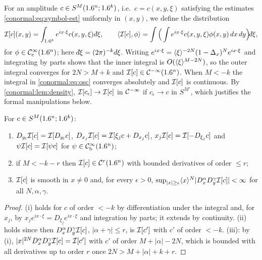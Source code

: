 For an amplitude $c\in S^M(1.6^n;1.6^k)$, i.e.\ $c=c(x,y,\xi)$ satisfying the
estimates \eqref{conormal:eq:symbol-est} uniformly in $(x,y)$, we define the
distribution
\begin{equation}\label{conormal:eq:osc}
  \osc{c}(x,y)=\int_{\R^k}e^{ix\cdot\xi}c(x,y,\xi)\,\dbar\xi,
  \qquad
  \pair{\osc{c}}{\phi}=\int\Big(\int e^{ix\cdot\xi}c(x,y,\xi)\phi(x,y)\,dx\,dy\Big)
  \dbar\xi,
\end{equation}
for $\phi\in\mathcal{C}^\infty_{\mathrm{c}}(1.6^n)$; here $\dbar\xi=(2\pi)^{-k}d\xi$.  Writing
$e^{ix\cdot\xi}=\langle \xi\rangle^{-2N}(1-\Delta_x)^Ne^{ix\cdot\xi}$ and integrating by
parts shows that the inner integral is $O(\langle \xi\rangle^{M-2N})$, so the outer
integral converges for $2N>M+k$ and $\mathcal{I}[c]\in\mathcal{C}^{-\infty}(1.6^n)$.  When $M<-k$ the
integral in \eqref{conormal:eq:osc} converges absolutely and $\mathcal{I}[c]$ is
continuous.  By \cref{conormal:lem:density}, $\mathcal{I}[c_\epsilon]\to\mathcal{I}[c]$ in
$\mathcal{C}^{-\infty}$ if $c_\epsilon\to c$ in $S^{M'}$, which justifies the formal
manipulations below.

\begin{lemma}\label{conormal:lem:osc-ops}
  For $c\in S^M(1.6^n;1.6^k)$:
  \begin{enumerate}[label=(\roman*)]
  \item $D_{y_l}\mathcal{I}[c]=\mathcal{I}[D_{y_l}c]$, $D_{x_j}\mathcal{I}[c]=\mathcal{I}[\xi_jc+D_{x_j}c]$,
    $x_j\mathcal{I}[c]=\mathcal{I}[-D_{\xi_j}c]$ and $\psi\mathcal{I}[c]=\mathcal{I}[\psi c]$ for
    $\psi\in\mathcal{C}^\infty_{\mathrm{b}}(1.6^n)$;
  \item if $M<-k-r$ then $\mathcal{I}[c]\in\mathcal C^r(1.6^n)$ with bounded derivatives
    of order $\le r$;
  \item $\mathcal{I}[c]$ is smooth in $x\ne0$ and, for every $\epsilon>0$,
    $\sup_{|x|\ge\epsilon}\langle x\rangle^N|D_x^\alpha D_y^\gamma\mathcal{I}[c]|<\infty$ for all
    $N,\alpha,\gamma$.
  \end{enumerate}
\end{lemma}
\begin{proof}
  (i) holds for $c$ of order $<-k$ by differentiation under the integral and,
  for $x_j$, by $x_je^{ix\cdot\xi}=D_{\xi_j}e^{ix\cdot\xi}$ and integration by
  parts; it extends by continuity.  (ii) holds since then $D_x^\alpha D_y^\gamma
  \mathcal{I}[c]$, $|\alpha+\gamma|\le r$, is $\mathcal{I}[c']$ with $c'$ of order $<-k$.  (iii):
  by (i), $|x|^{2N}D_x^\alpha D_y^\gamma\mathcal{I}[c]=\mathcal{I}[c']$ with $c'$ of order
  $M+|\alpha|-2N$, which is bounded with all derivatives up to order $r$ once
  $2N>M+|\alpha|+k+r$.
\end{proof}

